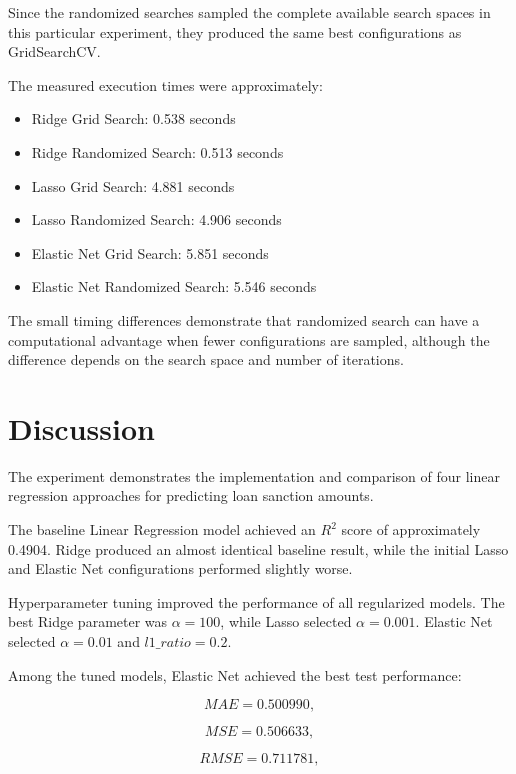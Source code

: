 \documentclass[12pt,a4paper]{article}
\begin{document}
Since the randomized searches sampled the complete available search
spaces in this particular experiment, they produced the same best
configurations as GridSearchCV.

The measured execution times were approximately:

\begin{itemize}
    \item Ridge Grid Search: 0.538 seconds
    \item Ridge Randomized Search: 0.513 seconds
    \item Lasso Grid Search: 4.881 seconds
    \item Lasso Randomized Search: 4.906 seconds
    \item Elastic Net Grid Search: 5.851 seconds
    \item Elastic Net Randomized Search: 5.546 seconds
\end{itemize}

The small timing differences demonstrate that randomized search can have
a computational advantage when fewer configurations are sampled, although
the difference depends on the search space and number of iterations.


\section{Discussion}

The experiment demonstrates the implementation and comparison of four
linear regression approaches for predicting loan sanction amounts.

The baseline Linear Regression model achieved an $R^2$ score of
approximately 0.4904. Ridge produced an almost identical baseline result,
while the initial Lasso and Elastic Net configurations performed slightly
worse.

Hyperparameter tuning improved the performance of all regularized models.
The best Ridge parameter was $\alpha=100$, while Lasso selected
$\alpha=0.001$. Elastic Net selected $\alpha=0.01$ and
$l1\_ratio=0.2$.

Among the tuned models, Elastic Net achieved the best test performance:

\[
MAE=0.500990,
\]

\[
MSE=0.506633,
\]

\[
RMSE=0.711781,
\]
\end{document}
